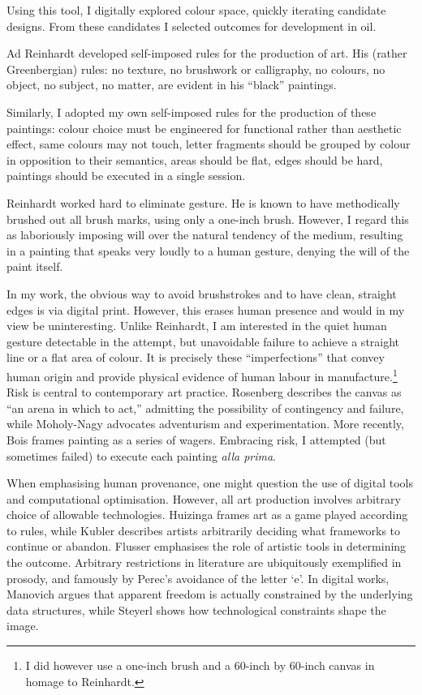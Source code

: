 \documentclass[12pt]{article}
\begin{document}
Using this tool, I digitally explored colour space, quickly iterating
candidate designs. From these candidates I selected outcomes for
development in oil.

Ad Reinhardt developed self-imposed rules for the production of
art.\cite[pp.~203--207]{artasart} His (rather Greenbergian) rules: no
texture, no brushwork or calligraphy, no colours, no object, no
subject, no matter, are evident in his ``black'' paintings.

Similarly, I adopted my own self-imposed rules for the production of
these paintings: colour choice must be engineered for functional
rather than aesthetic effect, same colours may not touch, letter
fragments should be grouped by colour in opposition to their
semantics, areas should be flat, edges should be hard, paintings
should be executed in a single session.

Reinhardt worked hard to eliminate gesture. He is known to have
methodically brushed out all brush marks, using only a one-inch
brush.\cite[p.~206]{artasart} However, I regard this as 
laboriously imposing will over the natural tendency of the medium,
resulting in a painting that speaks very loudly to a human gesture,
denying the will of the paint itself.

In my work, the obvious way to avoid brushstrokes and to have clean,
straight edges is via digital print. However, this erases human
presence and would in my view be uninteresting. Unlike Reinhardt, I am
interested in the quiet human gesture detectable in the attempt, but
unavoidable failure to achieve a straight line or a flat area of
colour. It is precisely these ``imperfections'' that convey human
origin and provide physical evidence of human labour in
manufacture.\footnote{I did however use a one-inch brush and a 60-inch
  by 60-inch canvas in homage to Reinhardt.} Risk is central to
contemporary art practice. Rosenberg describes the canvas as ``an
arena in which to act,''\cite[p.~22]{rosenberg1952american} admitting
the possibility of contingency and failure, while Moholy-Nagy
advocates adventurism and
experimentation.\cite[pp.~274--276]{moholy1947vision} More recently, Bois
frames painting as a series of wagers.\cite[p.~229]{bois1990painting}
Embracing risk, I attempted (but sometimes failed) to execute each
painting \emph{alla prima}.

When emphasising human provenance, one might question the use of
digital tools and computational optimisation. However, all art
production involves arbitrary choice of allowable
technologies. Huizinga frames art as a game played according to
rules,\cite{huizinga1938homo} while Kubler describes artists
arbitrarily deciding what frameworks to continue or
abandon.\cite{kubler1962shape} Flusser emphasises the role of artistic
tools in determining the outcome.\cite{flusser2000towards} Arbitrary
restrictions in literature are ubiquitously exemplified in prosody,
and famously by Perec's avoidance of the letter
`e'.\cite{perec1969disparition} In digital works, Manovich argues that apparent freedom is actually constrained by the underlying data structures,\cite{manovich2001language} while Steyerl shows how technological constraints shape the image.\cite{steyerl2009poorimage}
\end{document}
